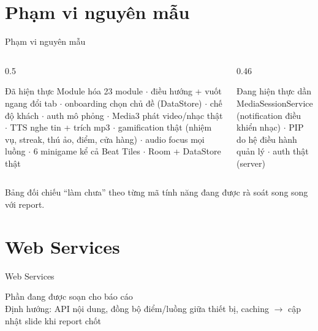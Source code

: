 \documentclass[aspectratio=169]{beamer}
\begin{document}
\section{Phạm vi nguyên mẫu}
\begin{frame}{Phạm vi nguyên mẫu}
  \begin{columns}
    \begin{column}{0.5\textwidth}
      \begin{block}{Đã hiện thực}
        \small Module hóa 23 module $\cdot$ điều hướng + vuốt ngang đổi tab $\cdot$ onboarding chọn chủ đề (DataStore) $\cdot$ chế độ khách $\cdot$ auth mô phỏng $\cdot$ Media3 phát video/nhạc thật $\cdot$ TTS nghe tin + trích mp3 $\cdot$ gamification thật (nhiệm vụ, streak, thú ảo, điểm, cửa hàng) $\cdot$ audio focus mọi luồng $\cdot$ 6 minigame kể cả Beat Tiles $\cdot$ Room + DataStore thật
      \end{block}
    \end{column}
    \begin{column}{0.46\textwidth}
      \begin{alertblock}{Đang hiện thực dần}
        \small MediaSessionService (notification điều khiển nhạc) $\cdot$ PIP do hệ điều hành quản lý $\cdot$ auth thật (server)
      \end{alertblock}
    \end{column}
  \end{columns}
  \vfill
  {\small Bảng đối chiếu ``làm chưa'' theo từng mã tính năng đang được rà soát song song với report.}
\end{frame}

\section{Web Services}
\begin{frame}{Web Services}
  \begin{center}
    \vspace{10mm}
    {\Large\color{brandgray} Phần đang được soạn cho báo cáo}\\[3mm]
    {\small Định hướng: API nội dung, đồng bộ điểm/luồng giữa thiết bị, caching $\rightarrow$ cập nhật slide khi report chốt}
  \end{center}
\end{frame}
\end{document}
